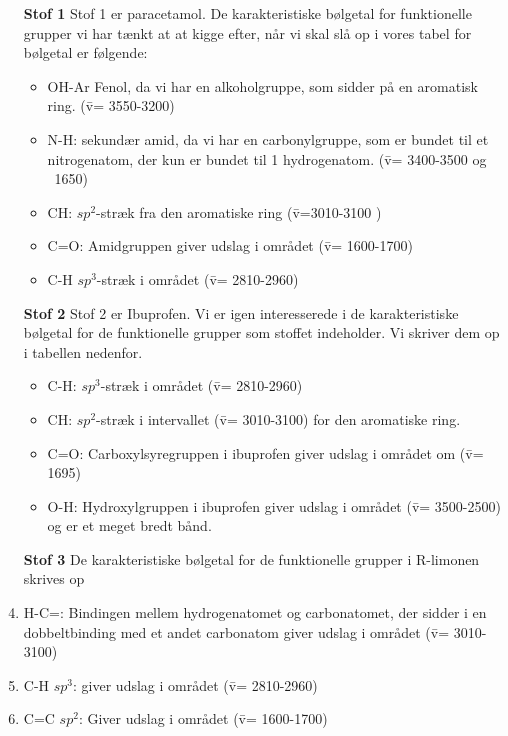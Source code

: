 \begin{enumerate}
\item[\textbf{Stof 1}] 
Stof 1 er paracetamol. De karakteristiske bølgetal for funktionelle grupper vi har tænkt at at kigge efter, når vi skal slå op i vores tabel for bølgetal er følgende: 
\begin{itemize}
\item OH-Ar Fenol, da vi har en alkoholgruppe, som sidder på en aromatisk ring. (\={v}= 3550-3200)

\item N-H: sekundær amid, da vi har en carbonylgruppe, som er bundet til et nitrogenatom, der kun er bundet til 1 hydrogenatom. (\={v}= 3400-3500 og ~1650)

\item CH: $sp^2$-stræk fra den aromatiske ring (\={v}=3010-3100 )

\item C=O: Amidgruppen giver udslag i området (\={v}= 1600-1700)

\item C-H $sp^3$-stræk i området (\={v}= 2810-2960)
\end{itemize}

\item[\textbf{Stof 2}]
Stof 2 er Ibuprofen. Vi er igen interesserede i de karakteristiske bølgetal for de funktionelle grupper som stoffet indeholder. Vi skriver dem op i tabellen nedenfor. 

\begin{itemize}
\item C-H: $sp^3$-stræk i området (\={v}= 2810-2960)

\item CH: $sp^2$-stræk i intervallet (\={v}= 3010-3100) for den aromatiske ring. 

\item C=O: Carboxylsyregruppen i ibuprofen giver udslag i området om (\={v}= 1695)

\item O-H: Hydroxylgruppen i ibuprofen giver udslag i området (\={v}= 3500-2500) og er et meget bredt bånd. 
\end{itemize}
\item[\textbf{Stof 3}]
De karakteristiske bølgetal for de funktionelle grupper i R-limonen skrives op

\item H-C=: Bindingen mellem hydrogenatomet og carbonatomet, der sidder i en dobbeltbinding med et andet carbonatom giver udslag i området (\={v}=  3010-3100)

\item C-H $sp^3$: giver udslag i området (\={v}= 2810-2960) 

\item C=C $sp^2$: Giver udslag i området (\={v}= 1600-1700) 
\end{enumerate}

